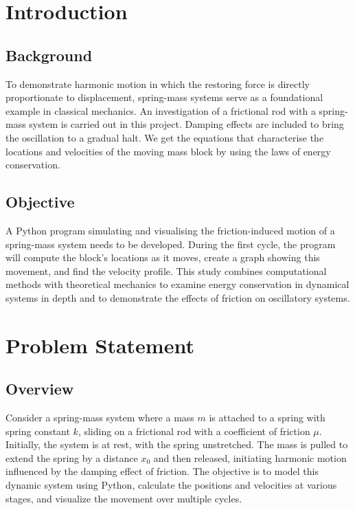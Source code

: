 \documentclass[12pt, a4paper, oneside]{report}
\begin{document}

\chapter{Introduction}

\section{Background}

To demonstrate harmonic motion in which the restoring force is directly proportionate to displacement, spring-mass systems serve as a foundational example in classical mechanics. An investigation of a frictional rod with a spring-mass system is carried out in this project. Damping effects are included to bring the oscillation to a gradual halt. We get the equations that characterise the locations and velocities of the moving mass block by using the laws of energy conservation.


\section{Objective}

A Python program simulating and visualising the friction-induced motion of a spring-mass system needs to be developed. During the first cycle, the program will compute the block's locations as it moves, create a graph showing this movement, and find the velocity profile. This study combines computational methods with theoretical mechanics to examine energy conservation in dynamical systems in depth and to demonstrate the effects of friction on oscillatory systems.




\chapter{Problem Statement}

\section{Overview}
Consider a spring-mass system where a mass \(m\) is attached to a spring with spring constant \(k\), sliding on a frictional rod with a coefficient of friction \(\mu\). Initially, the system is at rest, with the spring unstretched. The mass is pulled to extend the spring by a distance \(x_0\) and then released, initiating harmonic motion influenced by the damping effect of friction. The objective is to model this dynamic system using Python, calculate the positions and velocities at various stages, and visualize the movement over multiple cycles.
\end{document}

